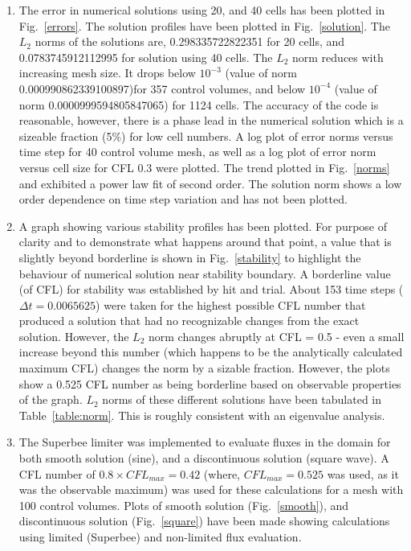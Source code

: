 \documentclass[a4paper,10pt]{article}
\begin{document}
\begin{enumerate}[I]
\item The error in numerical solutions using 20, and 40 cells has been plotted in Fig.~\ref{errors}. The solution profiles have been plotted in Fig.~\ref{solution}. The $L_2$ norms of the solutions are, 0.298335722822351 for 20 cells, and 0.0783745912112995 for solution using 40 cells. The $L_2$ norm reduces with increasing mesh size. It drops below $10^{-3}$ (value of norm 0.000990862339100897)for 357 control volumes, and below $10^{-4}$ (value of norm 0.0000999594805847065) for 1124 cells. The accuracy of the code is reasonable, however, there is a phase lead in the numerical solution which is a sizeable fraction (5\%) for low cell numbers. A log plot of error norms versus time step for 40 control volume mesh, as well as a log plot of error norm versus cell size for CFL 0.3 were plotted. The trend plotted in Fig.~\ref{norms} and exhibited a power law fit of second order. The solution norm shows a low order dependence on time step variation and has not been plotted.


\item A graph showing various stability profiles has been plotted. For purpose of clarity and to demonstrate what happens around that point, a value that is slightly beyond borderline is shown in Fig.~\ref{stability} to highlight the behaviour of numerical solution near stability boundary. A borderline value (of CFL) for stability was established by hit and trial. About 153 time steps ($\Delta t = 0.0065625$) were taken for the highest possible CFL number that produced a solution that had no recognizable changes from the exact solution. However, the $L_2$ norm changes abruptly at CFL = 0.5 - even a small increase beyond this number (which happens to be the analytically calculated maximum CFL) changes the norm by a sizable fraction. However, the plots show a 0.525 CFL number as being borderline based on observable properties of the graph. $L_2$ norms of these different solutions have been tabulated in Table~\ref{table:norm}. This is roughly consistent with an eigenvalue analysis.



\item The Superbee limiter was implemented to evaluate fluxes in the domain for both smooth solution (sine), and a discontinuous solution (square wave). A CFL number of $0.8 \times CFL_{max} = 0.42$ (where, $CFL_{max} = 0.525$ was used, as it was the observable maximum) was used for these calculations for a mesh with 100 control volumes. Plots of smooth solution (Fig.~\ref{smooth}), and discontinuous solution (Fig.~\ref{square}) have been made showing calculations using limited (Superbee) and non-limited flux evaluation.
\end{enumerate}
\end{document}
